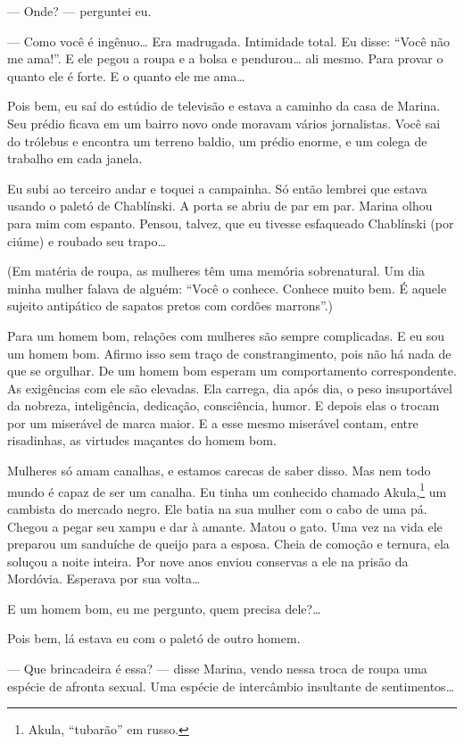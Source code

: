 --- Onde? --- perguntei eu.

--- Como você é ingênuo\ldots{} Era madrugada. Intimidade total. Eu disse:
``Você não me ama!''. E ele pegou a roupa e a bolsa e pendurou\ldots{} ali
mesmo. Para provar o quanto ele é forte. E o quanto ele me ama\ldots{}

Pois bem, eu saí do estúdio de televisão e estava a caminho da casa de
Marina. Seu prédio ficava em um bairro novo onde moravam vários
jornalistas. Você sai do trólebus e encontra um terreno baldio, um
prédio enorme, e um colega de trabalho em cada janela.

Eu subi ao terceiro andar e toquei a campainha. Só então lembrei que
estava usando o paletó de Chablínski. A porta se abriu de par em par.
Marina olhou para mim com espanto. Pensou, talvez, que eu tivesse
esfaqueado Chablínski (por ciúme) e roubado seu trapo\ldots{}

(Em matéria de roupa, as mulheres têm uma memória sobrenatural. Um dia
minha mulher falava de alguém: ``Você o conhece. Conhece muito bem. É
aquele sujeito antipático de sapatos pretos com cordões marrons''.)

Para um homem bom, relações com mulheres são sempre complicadas. E eu
sou um homem bom. Afirmo isso sem traço de constrangimento, pois não há
nada de que se orgulhar. De um homem bom esperam um comportamento
correspondente. As exigências com ele são elevadas. Ela carrega, dia
após dia, o peso insuportável da nobreza, inteligência, dedicação,
consciência, humor. E depois elas o trocam por um miserável de marca
maior. E a esse mesmo miserável contam, entre risadinhas, as virtudes
maçantes do homem bom.

Mulheres só amam canalhas, e estamos carecas de saber disso. Mas nem
todo mundo é capaz de ser um canalha. Eu tinha um conhecido chamado
Akula,\footnote{Akula, ``tubarão'' em russo.} um cambista do mercado
negro. Ele batia na sua mulher com o cabo de uma pá. Chegou a pegar seu
xampu e dar à amante. Matou o gato. Uma vez na vida ele preparou um
sanduíche de queijo para a esposa. Cheia de comoção e ternura, ela
soluçou a noite inteira. Por nove anos enviou conservas a ele na prisão
da Mordóvia. Esperava por sua volta\ldots{}

E um homem bom, eu me pergunto, quem precisa dele?\ldots{}

Pois bem, lá estava eu com o paletó de outro homem.

--- Que brincadeira é essa? --- disse Marina, vendo nessa troca de roupa
uma espécie de afronta sexual. Uma espécie de intercâmbio insultante de
sentimentos\ldots{}

